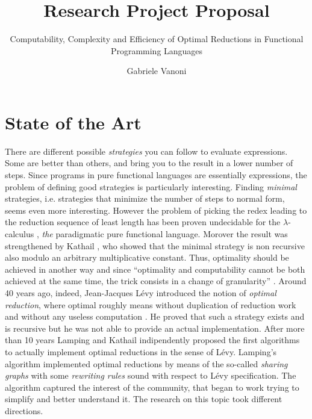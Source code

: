 \documentclass[english]{scrartcl}
\begin{document}
\title{Research Project Proposal}
\subtitle{Computability, Complexity and Efficiency of Optimal Reductions in Functional Programming Languages}
\author{Gabriele Vanoni}
\date{}
\maketitle
\section{State of the Art}
There are different possible \emph{strategies} you can follow to evaluate expressions. Some are better than others, and bring you to the result in a lower number of steps. Since programs in pure functional languages are essentially expressions, the problem of defining good strategies is particularly interesting. Finding \emph{minimal} strategies, i.e. strategies that minimize the number of steps to normal form, seems even more interesting. However the problem of picking the redex leading to the reduction sequence of least length has been proven undecidable for the $\lambda$-calculus \cite[Section~13.5]{barendregt_lambda_1984}, \emph{the} paradigmatic pure functional language. Morover the result was strengthened by Kathail \cite[Appendix]{kathail_optimal_1990}, who showed that the minimal strategy is non recursive also modulo an arbitrary multiplicative constant. Thus, optimality should be achieved in another way and since ``optimality and computability cannot be both achieved at the same time, the trick consists in a change of granularity'' \cite{terese_term_2003}. Around 40 years ago, indeed, Jean-Jacques Lévy introduced the notion of \emph{optimal reduction}, where optimal roughly means without duplication of reduction work and without any useless computation \cite{levy_reductions_1978}. He proved that such a strategy exists and is recursive but he was not able to provide an actual implementation. After more than 10 years Lamping \cite{lamping_algorithm_1990} and Kathail \cite{kathail_optimal_1990} indipendently proposed the first algorithms to actually implement optimal reductions in the sense of Lévy. Lamping's algorithm implemented optimal reductions by means of the so-called \emph{sharing graphs} with some \emph{rewriting rules} sound with respect to Lévy specification. The algorithm captured the interest of the community, that began to work trying to simplify and better understand it. The research on this topic took different directions.
\end{document}
